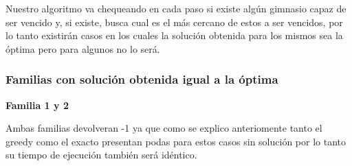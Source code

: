Nuestro algoritmo va chequeando en cada paso si existe alg\'un gimnasio capaz de ser vencido y, si existe, busca cual es el m\'as cercano de estos a ser vencidos, por lo tanto existir\'an casos en los cuales la soluci\'on obtenida para los mismos sea la \'optima pero para algunos no lo ser\'a.

\subsubsection*{Familias con soluci\'on obtenida igual a la \'optima}


\begin{center}
\textbf{Familia 1 y 2}
\end{center}

Ambas familias devolveran -1 ya que como se explico anteriomente tanto el greedy como el exacto presentan podas para estos casos sin soluci\'on por lo tanto su tiempo de ejecuci\'on tambi\'en ser\'a id\'entico.



\begin{figure} [!ht]
 \centering
       \label{fig:jaggies}
    \label{fig:moire}
    \end{figure}


